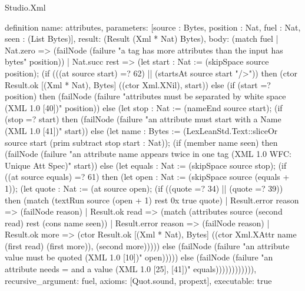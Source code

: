 \begin{lexlean}{Studio.Xml}
\begin{semanticmodule}
definition{
  name: attributes,
  parameters: [source : Bytes, position : Nat, fuel : Nat, seen : (List Bytes)],
  result: (Result (Xml * Nat) Bytes),
  body: (match fuel
    | Nat.zero => (failNode (failure "a tag has more attributes than the input has bytes" position))
    | Nat.succ rest => (let start : Nat := (skipSpace source position); (if (((at source start) =? 62) || (startsAt source start "/>")) then (ctor Result.ok [(Xml * Nat), Bytes] ((ctor Xml.XNil), start)) else (if (start =? position) then (failNode (failure "attributes must be separated by white space (XML 1.0 [40])" position)) else (let stop : Nat := (nameEnd source start); (if (stop =? start) then (failNode (failure "an attribute must start with a Name (XML 1.0 [41])" start)) else (let name : Bytes := (LexLeanStd.Text::sliceOr source start (prim subtract stop start : Nat)); (if (member name seen) then (failNode (failure "an attribute name appears twice in one tag (XML 1.0 WFC: Unique Att Spec)" start)) else (let equals : Nat := (skipSpace source stop); (if ((at source equals) =? 61) then (let open : Nat := (skipSpace source (equals + 1)); (let quote : Nat := (at source open); (if ((quote =? 34) || (quote =? 39)) then (match (textRun source (open + 1) rest 0x true quote)
      | Result.error reason => (failNode reason)
      | Result.ok read => (match (attributes source (second read) rest (cons name seen))
        | Result.error reason => (failNode reason)
        | Result.ok more => (ctor Result.ok [(Xml * Nat), Bytes] ((ctor Xml.XAttr name (first read) (first more)), (second more))))) else (failNode (failure "an attribute value must be quoted (XML 1.0 [10])" open))))) else (failNode (failure "an attribute needs = and a value (XML 1.0 [25], [41])" equals)))))))))))),
  recursive_argument: fuel,
  axioms: [Quot.sound, propext],
  executable: true
}


\end{semanticmodule}
\end{lexlean}
